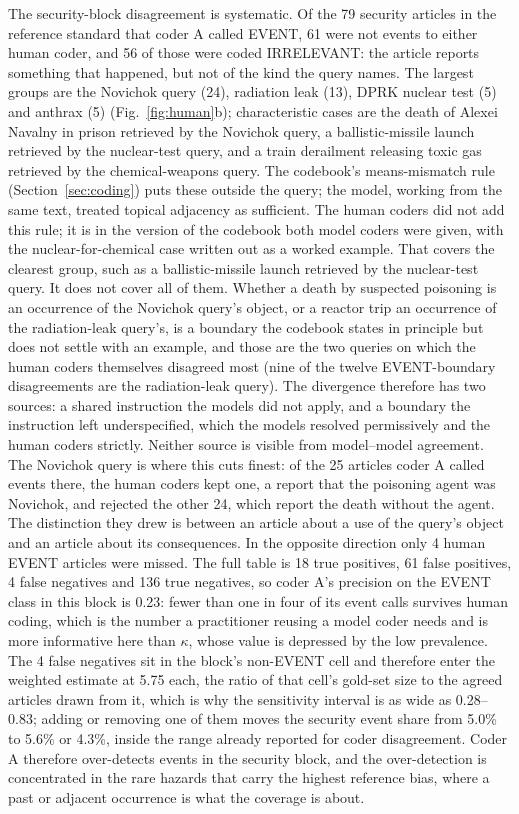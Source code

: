 \documentclass[1p,times]{elsarticle}
\begin{document}
The security-block disagreement is systematic. Of the 79 security articles in the reference standard that coder A called EVENT, 61 were not events to either human coder, and 56 of those were coded IRRELEVANT: the article reports something that happened, but not of the kind the query names. The largest groups are the Novichok query (24), radiation leak (13), DPRK nuclear test (5) and anthrax (5) (Fig.~\ref{fig:human}b); characteristic cases are the death of Alexei Navalny in prison retrieved by the Novichok query, a ballistic-missile launch retrieved by the nuclear-test query, and a train derailment releasing toxic gas retrieved by the chemical-weapons query. The codebook's means-mismatch rule (Section~\ref{sec:coding}) puts these outside the query; the model, working from the same text, treated topical adjacency as sufficient. The human coders did not add this rule; it is in the version of the codebook both model coders were given, with the nuclear-for-chemical case written out as a worked example. That covers the clearest group, such as a ballistic-missile launch retrieved by the nuclear-test query. It does not cover all of them. Whether a death by suspected poisoning is an occurrence of the Novichok query's object, or a reactor trip an occurrence of the radiation-leak query's, is a boundary the codebook states in principle but does not settle with an example, and those are the two queries on which the human coders themselves disagreed most (nine of the twelve EVENT-boundary disagreements are the radiation-leak query). The divergence therefore has two sources: a shared instruction the models did not apply, and a boundary the instruction left underspecified, which the models resolved permissively and the human coders strictly. Neither source is visible from model--model agreement. The Novichok query is where this cuts finest: of the 25 articles coder A called events there, the human coders kept one, a report that the poisoning agent was Novichok, and rejected the other 24, which report the death without the agent. The distinction they drew is between an article about a use of the query's object and an article about its consequences. In the opposite direction only 4 human EVENT articles were missed. The full table is 18 true positives, 61 false positives, 4 false negatives and 136 true negatives, so coder A's precision on the EVENT class in this block is 0.23: fewer than one in four of its event calls survives human coding, which is the number a practitioner reusing a model coder needs and is more informative here than $\kappa$, whose value is depressed by the low prevalence. The 4 false negatives sit in the block's non-EVENT cell and therefore enter the weighted estimate at 5.75 each, the ratio of that cell's gold-set size to the agreed articles drawn from it, which is why the sensitivity interval is as wide as 0.28--0.83; adding or removing one of them moves the security event share from 5.0\% to 5.6\% or 4.3\%, inside the range already reported for coder disagreement. Coder A therefore over-detects events in the security block, and the over-detection is concentrated in the rare hazards that carry the highest reference bias, where a past or adjacent occurrence is what the coverage is about.
\end{document}
